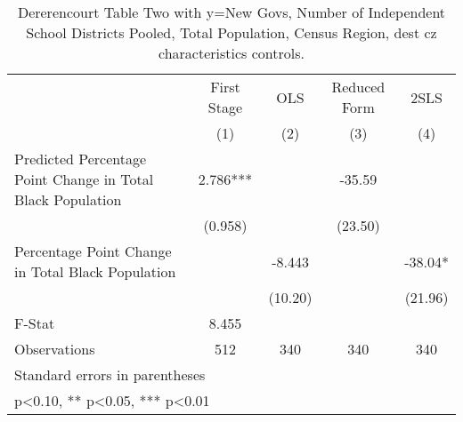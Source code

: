 \begin{table}[htbp]\centering
\def\sym#1{\ifmmode^{#1}\else\(^{#1}\)\fi}
\caption{Dererencourt Table Two with y=New Govs, Number of Independent School Districts  Pooled, Total Population, Census Region, dest cz characteristics controls.}
\begin{tabular}{l*{4}{c}}
\toprule
                    & First Stage   &         OLS   &Reduced Form   &        2SLS   \\
                    &\multicolumn{1}{c}{(1)}   &\multicolumn{1}{c}{(2)}   &\multicolumn{1}{c}{(3)}   &\multicolumn{1}{c}{(4)}   \\
\midrule
Predicted Percentage Point Change in Total Black Population&       2.786***&               &      -35.59   &               \\
                    &     (0.958)   &               &     (23.50)   &               \\
\addlinespace
Percentage Point Change in Total Black Population&               &      -8.443   &               &      -38.04*  \\
                    &               &     (10.20)   &               &     (21.96)   \\
\midrule
F-Stat              &       8.455   &               &               &               \\
Observations        &         512   &         340   &         340   &         340   \\
\bottomrule
\multicolumn{5}{l}{\footnotesize Standard errors in parentheses}\\
\multicolumn{5}{l}{\footnotesize * p<0.10, ** p<0.05, *** p<0.01}\\
\end{tabular}
\end{table}
